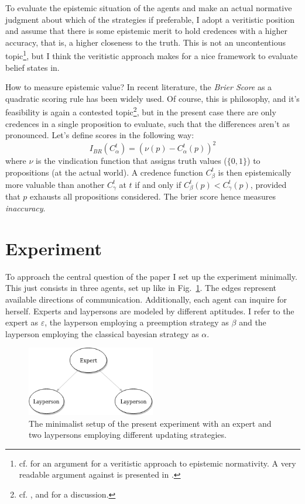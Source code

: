 \documentclass[11pt, a4paper]{article}
\renewcommand{\i}[1]{\emph{#1}}
\renewcommand{\a}{\alpha}
\begin{document}
To evaluate the epistemic situation of the agents and make an actual normative judgment about which of the strategies if preferable, I adopt a veritistic position and assume that there is some epistemic merit to hold credences with a higher accuracy, that is, a higher closeness to the truth. This is not an uncontentious topic\footnote{cf. \textcite{Goldman2001} for an argument for a veritistic approach to epistemic normativity. A very readable argument against is presented in \textcite{Berker2013}.}, but I think the veritistic approach makes for a nice framework to evaluate belief states in. 

How to measure epistemic value? In recent literature, the \i{Brier Score} as a quadratic scoring rule has been widely used. Of course, this is philosophy, and it's feasibility is again a contested topic\footnote{cf. \textcite{Joyce1998-JOYANV}, \textcite{Maher2002-MAHJAF} and \textcite{Fallis2016} for a discussion.}, but in the present case there are only credences in a single proposition to evaluate, such that the differences aren't as pronounced. Let's define scores in the following way:
\begin{equation*}
    I_{BR}(C^t_\a) = {(\nu(p) - C^t_\a(p))}^2
\end{equation*}
where $\nu$ is the vindication function that assigns truth values ($\{0,1\}$) to propositions (at the actual world).
A credence function $C^t_\beta$ is then epistemically more valuable than another $C^t_\gamma$ at $t$ if and only if $C^t_\beta(p) < C^t_\gamma(p)$, provided that $p$ exhausts all propositions considered. The brier score hence measures \i{inaccuracy}.

\section{Experiment}

To approach the central question of the paper I set up the experiment minimally. This just consists in three agents, set up like in Fig.~\ref{fig:el}. The edges represent available directions of communication. Additionally, each agent can inquire for herself. Experts and laypersons are modeled by different aptitudes. I refer to the expert as $\varepsilon$, the layperson employing a preemption strategy as $\beta$ and the layperson employing the classical bayesian strategy as $\a$. 

\begin{figure}[ht]
	\centering
    \includegraphics[width=0.5\textwidth]{Expert_Layperson.png}
	\caption{The minimalist setup of the present experiment with an expert and two laypersons employing different updating strategies.\label{fig:el}}
\end{figure}
\end{document}

